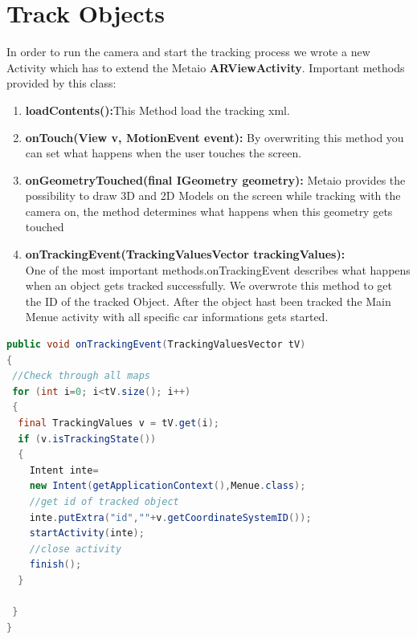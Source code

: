 \section{Track Objects}
In order to run the camera and start the tracking process we wrote a new Activity which has to extend the Metaio \textbf{ARViewActivity}. Important methods provided by this class:
\begin{enumerate}
\item \textbf{loadContents():}This Method load the tracking xml.
\item \textbf{onTouch(View v, MotionEvent event):} By overwriting this method you can set what happens when the user touches the screen. 

\item \textbf{onGeometryTouched(final IGeometry geometry):} Metaio provides the possibility to draw 3D and 2D Models on the screen while tracking with the camera on, the method determines what happens when this geometry gets touched 

\item \textbf{onTrackingEvent(TrackingValuesVector trackingValues):} 
\\
One of the most important methods.onTrackingEvent describes what happens when an object gets tracked successfully. We overwrote this method to get the ID of the tracked Object. After the object hast been tracked the Main Menue activity with all specific car informations gets started.   
\end{enumerate} 
\newpage
\begin{lstlisting}[language=java, caption=Tracking Event,captionpos=b]
public void onTrackingEvent(TrackingValuesVector tV)
{
 //Check through all maps 
 for (int i=0; i<tV.size(); i++)
 {
  final TrackingValues v = tV.get(i);
  if (v.isTrackingState())
  {
	Intent inte=
	new Intent(getApplicationContext(),Menue.class);
	//get id of tracked object
	inte.putExtra("id",""+v.getCoordinateSystemID());
	startActivity(inte);
	//close activity
	finish();
  }
				
 }
}
\end{lstlisting}
